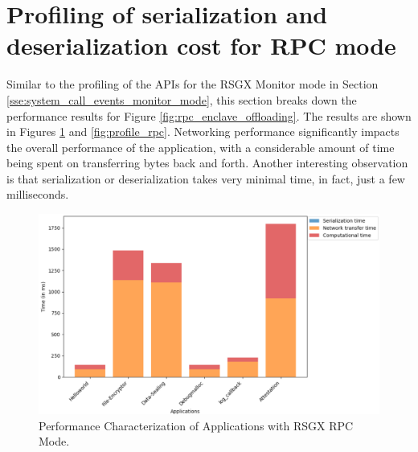 \documentclass[article, doublespace,nopageskip]{VTthesis} %
\newcommand{\monitor}{RSGX \xspace}
\begin{document}
    \section{Profiling of serialization and deserialization cost for RPC mode} \label{sse:Profiling of serialization and deserialization cost for RPC mode}
    Similar to the profiling of the APIs for the \monitor Monitor mode in Section \ref{sse:system_call_events_monitor_mode}, this section breaks down the performance results for Figure \ref{fig:rpc_enclave_offloading}. The results are shown in Figures \ref{fig:perf_breakdown_rpc} and \ref{fig:profile_rpc}. Networking performance significantly impacts the overall performance of the application, with a considerable amount of time being spent on transferring bytes back and forth. Another interesting observation is that serialization or deserialization takes very minimal time, in fact, just a few milliseconds.

    \begin{figure}[htb]
        \centering
        \includegraphics[scale=0.6]{figures/perf_breakdown_rpc.png}
        \caption{Performance Characterization of Applications with \monitor RPC Mode.} 
        \label{fig:perf_breakdown_rpc}
    \end{figure}
\end{document}
